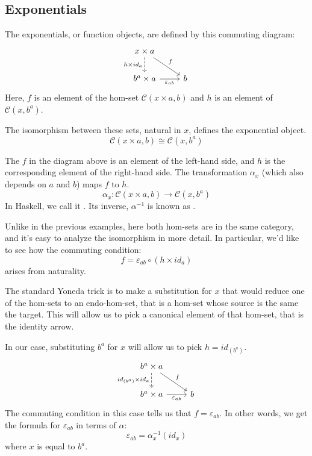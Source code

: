 \documentclass[DaoFP]{subfiles}
\begin{document}
\subsection{Exponentials}

The exponentials, or function objects, are defined by this commuting diagram:
\[
 \begin{tikzcd}
 x \times a
 \arrow[d, dashed, "h \times id_a"']
 \arrow[rd, "f"]
 \\
 b^a \times a
 \arrow[r, "\varepsilon_{a b}"']
& b
 \end{tikzcd}
\]
Here, $f$ is an element of the hom-set $\mathcal{C}(x \times a, b)$ and $h$ is an element of $\mathcal{C}(x, b^a)$. 

The isomorphism between these sets, natural in $x$, defines the exponential object. 
\[\mathcal{C}(x \times a, b) \cong \mathcal{C}(x, b^a)\]

The $f$ in the diagram above is an element of the left-hand side, and $h$ is the corresponding element of the right-hand side. The transformation $\alpha_x$ (which also depends on $a$ and $b$) maps $f$ to $h$.
\[ \alpha_x \colon \mathcal{C}(x \times a, b) \to \mathcal{C}(x, b^a) \]
In Haskell, we call it . Its inverse, $\alpha^{-1}$ is known as .

Unlike in the previous examples, here both hom-sets are in the same category, and it's easy to analyze the isomorphism in more detail. In particular, we'd like to see how the commuting condition:
\[  f = \varepsilon_{a b} \circ (h \times id_a) \]
arises from naturality.

The standard Yoneda trick is to make a substitution for $x$ that would reduce one of the hom-sets to an endo-hom-set, that is a hom-set whose source is the same the target. This will allow us to pick a canonical element of that hom-set, that is the identity arrow.

In our case, substituting $b^a$ for $x$ will allow us to pick $h = id_{(b^a)}$.
\[
 \begin{tikzcd}
 b^a \times a
 \arrow[d, dashed, "id_{(b^a)} \times id_a"']
 \arrow[rd, "f"]
 \\
 b^a \times a
 \arrow[r, "\varepsilon_{a b}"']
& b
 \end{tikzcd}
\]
The commuting condition in this case tells us that $f = \varepsilon_{a b}$. In other words, we get the formula for $\varepsilon_{a b}$ in terms of $\alpha$:
\[ \varepsilon_{a b} = \alpha_{x}^{-1} (id_{x}) \]
where $x$ is equal to $b^a$.
\end{document}
